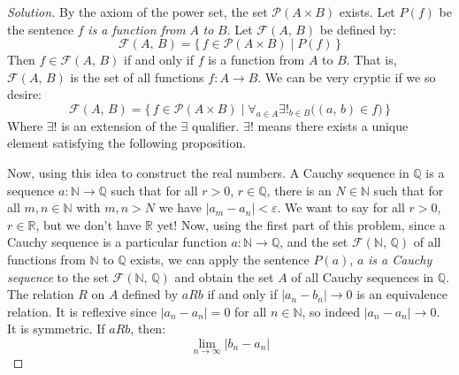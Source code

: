 \documentclass{article}
\theoremstyle{normal}
\begin{document}
    \color{black}
    \begin{proof}[Solution]
        By the axiom of the power set, the set $\mathcal{P}(A\times{B})$ exists.
        Let $P(f)$ be the sentence $f$ \textit{is a function from} $A$
        \textit{to} $B$. Let $\mathcal{F}(A,\,B)$ be defined by:
        \begin{equation}
            \mathcal{F}(A,\,B)
            =\{\,f\in\mathcal{P}(A\times{B})\;|\;P(f)\,\}
        \end{equation}
        Then $f\in\mathcal{F}(A,\,B)$ if and only if $f$ is a function from $A$
        to $B$. That is, $\mathcal{F}(A,\,B)$ is the set of all functions
        $f:A\rightarrow{B}$. We can be very cryptic if we so desire:
        \begin{equation}
            \mathcal{F}(A,\,B)
            =\Big\{\,f\in\mathcal{P}(A\times{B})\;|\;
                \forall_{a\in{A}}\exists!_{b\in{B}}\big((a,\,b)\in{f}\big)
                \,\Big\}
        \end{equation}
        Where $\exists!$ is an extension of the $\exists$ qualifier.
        $\exists!$ means there exists a unique element satisfying the
        following proposition.
        \par\hfill\par
        Now, using this idea to construct the real numbers. A Cauchy
        sequence in $\mathbb{Q}$ is a sequence
        $a:\mathbb{N}\rightarrow\mathbb{Q}$ such that for all
        $r>0$, $r\in\mathbb{Q}$, there is an $N\in\mathbb{N}$ such that for
        all $m,n\in\mathbb{N}$ with $m,n>N$ we have
        $|a_{m}-a_{n}|<\varepsilon$. We want to say for all
        $r>0$, $r\in\mathbb{R}$, but we don't have $\mathbb{R}$ yet!
        Now, using the first part of this problem, since a Cauchy sequence
        is a particular function $a:\mathbb{N}\rightarrow\mathbb{Q}$, and
        the set $\mathcal{F}(\mathbb{N},\,\mathbb{Q})$ of all functions
        from $\mathbb{N}$ to $\mathbb{Q}$ exists, we can apply the sentence
        $P(a)$, $a$ \textit{is a Cauchy sequence} to the set
        $\mathcal{F}(\mathbb{N},\,\mathbb{Q})$ and obtain the set $A$ of all
        Cauchy sequences in $\mathbb{Q}$. The relation $R$ on $A$ defined by
        $aRb$ if and only if $|a_{n}-b_{n}|\rightarrow{0}$ is an equivalence
        relation. It is reflexive since $|a_{n}-a_{n}|=0$ for all
        $n\in\mathbb{N}$, so indeed $|a_{n}-a_{n}|\rightarrow{0}$. It is
        symmetric. If $aRb$, then:
        \begin{equation}
            \lim_{n\rightarrow\infty}|b_{n}-a_{n}|

\end{equation}
\end{proof}
\end{document}
